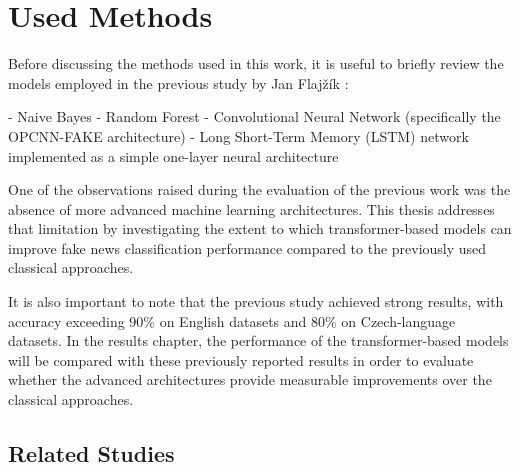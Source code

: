 \chapter{Used Methods}


\begin{markdown}

Before discussing the methods used in this work, it is useful to briefly review the models employed in the previous study by Jan Flajžík \cite{flajzik_classification_2024}:

- Naive Bayes
- Random Forest
- Convolutional Neural Network (specifically the OPCNN-FAKE architecture)
- Long Short-Term Memory (LSTM) network implemented as a simple one-layer neural architecture

One of the observations raised during the evaluation of the previous work was the absence of more advanced machine learning architectures. This thesis addresses that limitation by investigating the extent to which transformer-based models can improve fake news classification performance compared to the previously used classical approaches.

It is also important to note that the previous study achieved strong results, with accuracy exceeding 90\% on English datasets and 80\% on Czech-language datasets. In the results chapter, the performance of the transformer-based models will be compared with these previously reported results in order to evaluate whether the advanced architectures provide measurable improvements over the classical approaches.

\end{markdown}

\section{Related Studies}

